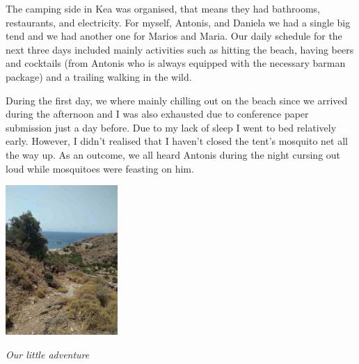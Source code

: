 \documentclass[10pt,a4paper]{article} %
\begin{document}
\begin{multicols}{3}
The camping side in Kea was organised, that means they had bathrooms, restaurants, 
and electricity. 
For myself, Antonis, and Daniela we had a single big tend and we had another one for 
Marios and Maria. 
Our daily schedule for the next three days included mainly activities such as hitting 
the beach, having beers and cocktails (from Antonis who is always equipped with the 
necessary barman package) and a trailing walking in the wild.


During the first day, we where mainly chilling out on the beach since 
we arrived during the afternoon and I was also exhausted due to conference 
paper submission just a day before. 
Due to my lack of sleep I went to bed relatively early. 
However, I didn't realised that I haven't closed the tent's mosquito net all the 
way up.  
As an outcome, we all heard Antonis during the night cursing out loud while mosquitoes 
were feasting on him.  

\begin{center}
	\includegraphics[width=0.32\textwidth]{media/way_to_beach.jpg}
	\par\textit{Our little adventure}
\end{center}


\end{multicols}
\end{document}
